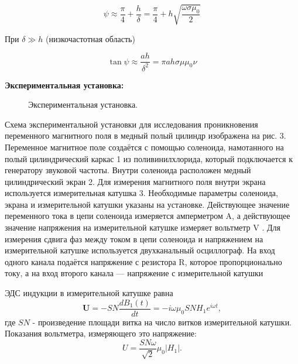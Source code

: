 \documentclass[a4paper, 12pt]{article}%
\begin{document}
	\begin{equation}
		\psi \approx \frac{\pi}{4} + \frac{h}{\delta} = 
		\frac{\pi}{4} + h \sqrt{\frac{\omega \sigma \mu_0}{2}}
		\label{eq:faza_high_freq}
	\end{equation}
	
	При $\delta \gg h$ (низкочастотная область)
	
	\begin{equation}
		\tan \psi \approx \frac{ah}{\delta^2} = \pi a h \sigma \mu \mu_0 \nu
		\label{eq:faza_low_freq}
	\end{equation}
	
	\textbf{Экспериментальная установка: }\\
	\begin{figure}[H]
		\caption{Экспериментальная установка.}
	\end{figure}
	Схема экспериментальной установки для исследования проникновения переменного магнитного поля в медный полый цилиндр изображена
	на рис. 3. Переменное магнитное поле создаётся с помощью соленоида,
	намотанного на полый цилиндрический каркас 1 из поливинилхлорида,
	который подключается к генератору звуковой частоты. Внутри соленоида расположен медный цилиндрический экран 2. Для измерения магнитного поля внутри экрана используется измерительная катушка 3.
	Необходимые параметры соленоида, экрана и измерительной катушки
	указаны на установке. Действующее значение переменного тока в цепи
	соленоида измеряется амперметром A, а действующее значение напряжения на измерительной катушке измеряет вольтметр V . Для измерения
	сдвига фаз между током в цепи соленоида и напряжением на измерительной катушке используется двухканальный осциллограф. На вход одного
	канала подаётся напряжение с резистора R, которое пропорционально
	току, а на вход второго канала — напряжение с измерительной катушки
	
	ЭДС индукции в измерительной катушке равна
	$$
	\boldsymbol{U}=-S N \frac{d B_1(t)}{d t}=-i \omega \mu_0 S N H_1 e^{i \omega t},
	$$
	где $S N$ - произведение площади витка на число витков измерительной катушки. Показания вольтметра, измеряющего это напряжение:
	$$
	U=\frac{S N \omega}{\sqrt{2}} \mu_0\left|H_1\right| .
	$$
\end{document}
